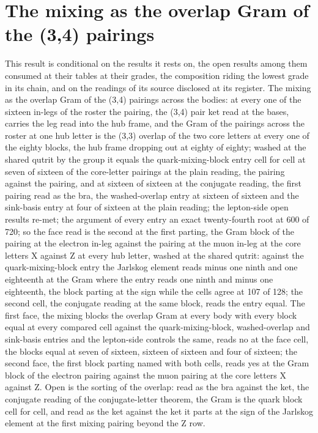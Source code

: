 \section{The mixing as the overlap Gram of the (3,4) pairings}\label{mod:VI-7-D543182-w-mxog}
\begin{chwall}\label{box:VI-7-D543182-w-mxog:1}
This result is conditional on the results it rests on, the open results among them consumed at their tables at their grades, the composition riding the lowest grade in its chain, and on the readings of its source disclosed at its register. The mixing as the overlap Gram of the (3,4) pairings across the bodies: at every one of the sixteen in-legs of the roster the pairing, the (3,4) pair ket read at the bases, carries the leg read into the hub frame, and the Gram of the pairings across the roster at one hub letter is the (3,3) overlap of the two core letters at every one of the eighty blocks, the hub frame dropping out at eighty of eighty; washed at the shared qutrit by the group it equals the quark-mixing-block entry cell for cell at seven of sixteen of the core-letter pairings at the plain reading, the pairing against the pairing, and at sixteen of sixteen at the conjugate reading, the first pairing read as the bra, the washed-overlap entry at sixteen of sixteen and the sink-basis entry at four of sixteen at the plain reading; the lepton-side open results re-met; the argument of every entry an exact twenty-fourth root at 600 of 720; so the face read is the second at the first parting, the Gram block of the pairing at the electron in-leg against the pairing at the muon in-leg at the core letters X against Z at every hub letter, washed at the shared qutrit: against the quark-mixing-block entry the Jarlskog element reads minus one ninth and one eighteenth at the Gram where the entry reads one ninth and minus one eighteenth, the block parting at the sign while the cells agree at 107 of 128; the second cell, the conjugate reading at the same block, reads the entry equal.
The first face, the mixing blocks the overlap Gram at every body with every block equal at every compared cell against the quark-mixing-block, washed-overlap and sink-basis entries and the lepton-side controls the same, reads no at the face cell, the blocks equal at seven of sixteen, sixteen of sixteen and four of sixteen; the second face, the first block parting named with both cells, reads yes at the Gram block of the electron pairing against the muon pairing at the core letters X against Z. Open is the sorting of the overlap: read as the bra against the ket, the conjugate reading of the conjugate-letter theorem, the Gram is the quark block cell for cell, and read as the ket against the ket it parts at the sign of the Jarlskog element at the first mixing pairing beyond the Z row.
\end{chwall}
